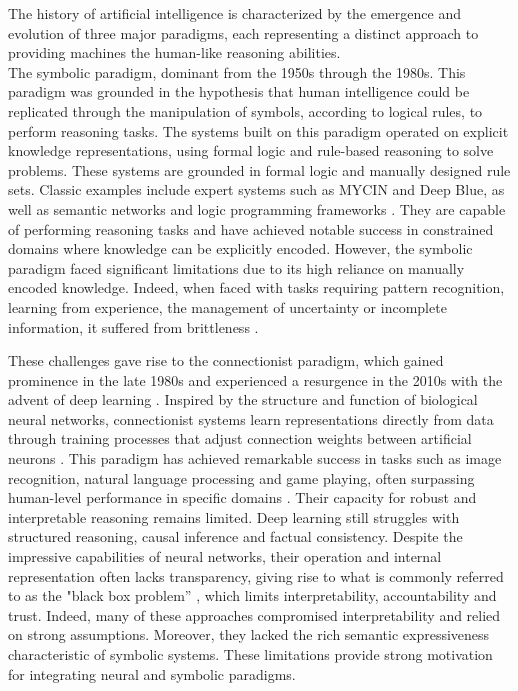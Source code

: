 \documentclass[12pt,a4paper]{report}
\begin{document}
The history of artificial intelligence is characterized by the emergence and evolution of three major paradigms, each representing a distinct approach to providing machines the human-like reasoning abilities. 
\\
The symbolic paradigm, dominant from the 1950s through the 1980s. This paradigm was grounded in the hypothesis that human intelligence could be replicated through the manipulation of symbols, according to logical rules, to perform reasoning tasks. The systems  built on this paradigm operated on explicit knowledge representations, using formal logic and rule-based reasoning to solve problems. These systems are grounded in formal logic and manually designed rule sets. Classic examples include expert systems such as MYCIN and Deep Blue, as well as semantic networks and logic programming frameworks \cite{chiave16}. 
They are capable of performing reasoning tasks and have achieved notable success in constrained domains where knowledge can be explicitly encoded. 
However, the symbolic paradigm faced significant limitations due to its high reliance on manually encoded knowledge. 
Indeed, when faced with tasks requiring pattern recognition, learning from experience, the management of uncertainty or incomplete information, it suffered from brittleness \cite{chiave16, chiave15}.

These challenges gave rise to the connectionist paradigm, which gained prominence in the late 1980s and experienced a resurgence in the 2010s with the advent of deep learning \cite{chiave40}. Inspired by the structure and function of biological 
neural networks, connectionist systems learn representations directly from data through training processes that adjust connection weights between artificial neurons \cite{chiave26, chiave40}. This paradigm has achieved remarkable success in tasks such as image recognition, natural language processing and game playing, often surpassing human-level performance in specific domains \cite{chiave1}. Their capacity for robust and interpretable reasoning remains limited. Deep learning still struggles with structured reasoning, causal inference and factual consistency. Despite the impressive capabilities of neural networks, their operation and internal representation often lacks transparency, giving rise to what is commonly referred to as the "black box problem” \cite{chiave15}, which limits interpretability, accountability and trust.
Indeed, many of these approaches compromised interpretability and relied on strong assumptions. Moreover, they lacked the rich semantic expressiveness characteristic of symbolic systems. These limitations provide strong motivation for integrating neural and symbolic paradigms.
\end{document}
